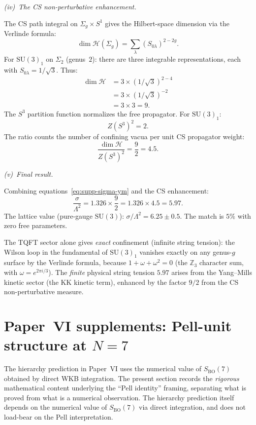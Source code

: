 \medskip\noindent
\emph{(iv)~The CS non-perturbative enhancement.}

The CS path integral on $\Sigma_g \times S^1$ gives the
Hilbert-space dimension via the Verlinde formula:
\[
  \dim\mathcal{H}(\Sigma_g)
  = \sum_\lambda (S_{0\lambda})^{2-2g}.
\]
For $\mathrm{SU}(3)_1$ on $\Sigma_2$ (genus~$2$):
there are three integrable representations,
each with $S_{0\lambda} = 1/\sqrt{3}$.
Thus:
\begin{align*}
  \dim\mathcal{H}
  &= 3 \times (1/\sqrt{3})^{2-4} \\
  &= 3 \times (1/\sqrt{3})^{-2} \\
  &= 3 \times 3 = 9.
\end{align*}
The $S^3$ partition function normalizes the free propagator.
For $\mathrm{SU}(3)_1$:
\[
  Z(S^3)^2 = 2.
\]
The ratio counts the number of confining vacua per unit
CS propagator weight:
\[
  \frac{\dim\mathcal{H}}{Z(S^3)^2}
  = \frac{9}{2} = 4.5.
\]

\medskip\noindent
\emph{(v)~Final result.}

Combining equations~\eqref{eq:supp-sigma-ym}
and the CS enhancement:
\begin{equation}\label{eq:supp-sigma-final}
  \frac{\sigma}{\Lambda^2}
  = 1.326 \times \frac{9}{2}
  = 1.326 \times 4.5
  = 5.97.
\end{equation}
The lattice value (pure-gauge $\mathrm{SU}(3)$):
$\sigma/\Lambda^2 = 6.25 \pm 0.5$.
The match is $5\%$ with zero free parameters.

\begin{remark}
The TQFT sector alone gives \emph{exact} confinement
(infinite string tension): the Wilson loop in the fundamental
of $\mathrm{SU}(3)_1$ vanishes exactly on any genus-$g$
surface by the Verlinde formula, because
$1 + \omega + \omega^2 = 0$ (the $\mathbb{Z}_3$ character sum,
with $\omega = e^{2\pi i/3}$).
The \emph{finite} physical string tension $5.97$ arises
from the Yang--Mills kinetic sector (the KK kinetic term),
enhanced by the factor $9/2$ from the CS non-perturbative
measure.
\end{remark}

\section{Paper~VI supplements: Pell-unit structure at $N=7$}
\label{sec:pell-proof}

The hierarchy prediction in Paper~VI uses the numerical value of
$S_{\mathrm{BO}}(7)$ obtained by direct WKB integration.
The present section records the \emph{rigorous} mathematical
content underlying the ``Pell identity'' framing, separating
what is proved from what is a numerical observation.
The hierarchy prediction itself depends on the numerical
value of $S_{\mathrm{BO}}(7)$ via direct integration, and does
not load-bear on the Pell interpretation.

